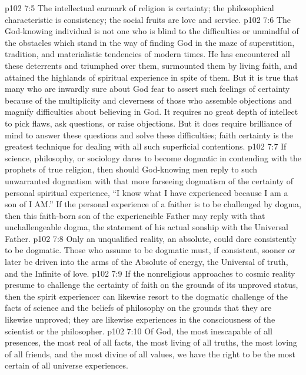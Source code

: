 \vs p102 7:5 The intellectual earmark of religion is certainty; the philosophical characteristic is consistency; the social fruits are love and service.
\vs p102 7:6 \pc The God\hyp{}knowing individual is not one who is blind to the difficulties or unmindful of the obstacles which stand in the way of finding God in the maze of superstition, tradition, and materialistic tendencies of modern times. He has encountered all these deterrents and triumphed over them, surmounted them by living faith, and attained the highlands of spiritual experience in spite of them. But it is true that many who are inwardly sure about God fear to assert such feelings of certainty because of the multiplicity and cleverness of those who assemble objections and magnify difficulties about believing in God. It requires no great depth of intellect to pick flaws, ask questions, or raise objections. But it does require brilliance of mind to answer these questions and solve these difficulties; faith certainty is the greatest technique for dealing with all such superficial contentions.
\vs p102 7:7 \pc If science, philosophy, or sociology dares to become dogmatic in contending with the prophets of true religion, then should God\hyp{}knowing men reply to such unwarranted dogmatism with that more farseeing dogmatism of the certainty of personal spiritual experience, “I know what I have experienced because I am a son of I AM.” If the personal experience of a faither is to be challenged by dogma, then this faith\hyp{}born son of the experiencible Father may reply with that unchallengeable dogma, the statement of his actual sonship with the Universal Father.
\vs p102 7:8 Only an unqualified reality, an absolute, could dare consistently to be dogmatic. Those who assume to be dogmatic must, if consistent, sooner or later be driven into the arms of the Absolute of energy, the Universal of truth, and the Infinite of love.
\vs p102 7:9 If the nonreligious approaches to cosmic reality presume to challenge the certainty of faith on the grounds of its unproved status, then the spirit experiencer can likewise resort to the dogmatic challenge of the facts of science and the beliefs of philosophy on the grounds that they are likewise unproved; they are likewise experiences in the consciousness of the scientist or the philosopher.
\vs p102 7:10 \pc Of God, the most inescapable of all presences, the most real of all facts, the most living of all truths, the most loving of all friends, and the most divine of all values, we have the right to be the most certain of all universe experiences.
